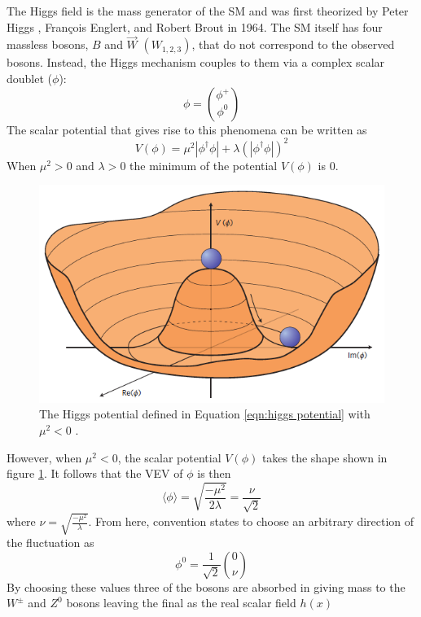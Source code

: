 		The Higgs field is the mass generator of the \gls{SM} and was first theorized by Peter Higgs \cite{Higgs-paper}, François Englert, and Robert Brout \cite{Englert-Brout} in 1964.  The \gls{SM} itself has four massless bosons, $B$ and $\vec{W}$ $(W_{1,2,3})$, that do not correspond to the observed bosons. Instead, the Higgs mechanism couples to them via a complex scalar doublet ($\phi$): 
		\begin{equation}\label{eqn:scal doub} \phi = \binom{\phi^+}{\phi^0}\end{equation}
		The scalar potential that gives rise to this phenomena can be written as 
		\begin{equation}\label{eqn:higgs potential} V(\phi) = \mu^2 |\phi^{\dagger}\phi| + \lambda (|\phi^{\dagger}\phi|)^2\end{equation}
		When $\mu^2>0$ and $\lambda>0$ the minimum of the potential $V(\phi)$ is 0. 
		\begin{figure}[!ht] \centering \includegraphics[width=.7\textwidth,keepaspectratio=true]{chapters/chapter2_theory/images/higgspotential.png} \caption{The Higgs potential defined in Equation \ref{eqn:higgs potential} with $\mu^2<0$ \cite{Higgs-phys}.} \label{fig:higgs-potential}\end{figure}
		However, when $\mu^2<0$, the scalar potential $V(\phi)$ takes the shape shown in figure \ref{fig:higgs-potential}.
		It follows that the \gls{VEV} of $\phi$ is then 
		\begin{equation}\label{eqn:higgs vev} \langle \phi \rangle = \sqrt{\frac{-\mu^2}{2\lambda}} = \frac{\nu}{\sqrt{2}}	\end{equation}
		where $\nu = \sqrt{\frac{-\mu^2}{\lambda}}$.
		From here, convention states to choose an arbitrary direction of the fluctuation as 
		\begin{equation}\label{eqn:phi zero} \phi^0 = \frac{1}{\sqrt{2}} \binom{0}{\nu} \end{equation}
		By choosing these values three of the bosons are absorbed in giving mass to the $W^{\pm}$ and $Z^0$ bosons leaving the final as the real scalar field $h(x)$
